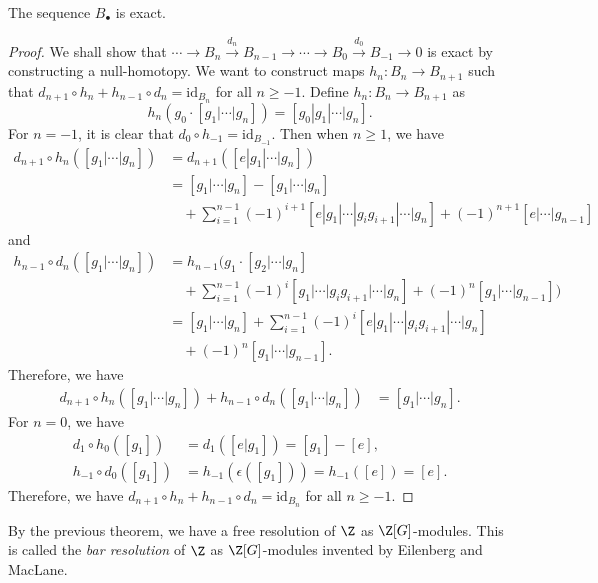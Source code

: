 \begin{theorem}
    The sequence $B_\bullet$ is exact.
\end{theorem}
\begin{proof}
    We shall show that $\cdots \to B_n \xrightarrow{d_n} B_{n-1} \to \cdots \to B_0 \xrightarrow{d_0} B_{-1} \to 0$ is exact
    by constructing a null-homotopy.
    We want to construct maps $h_n: B_n \to B_{n+1}$ such that $d_{n+1} \circ h_n + h_{n-1} \circ d_n = \text{id}_{B_n}$ for all $n \geq -1$.
    Define $h_n: B_n \to B_{n+1}$ as
    \[
        h_n(g_0\cdot [g_1|\cdots|g_n]) = [g_0|g_1|\cdots|g_n].
    \]
    For $n=-1$, it is clear that $d_0 \circ h_{-1} = \text{id}_{B_{-1}}$.
    Then when $n \geq 1$, we have
    \begin{align*}
        d_{n+1} \circ h_n([g_1|\cdots|g_n]) &= d_{n+1}([e|g_1|\cdots|g_n])\\
        &= [g_1|\cdots|g_n]-[g_1|\cdots|g_n] \\
        &\quad + \sum_{i=1}^{n-1} (-1)^{i+1} [e|g_1|\cdots|g_ig_{i+1}|\cdots|g_n] + (-1)^{n+1} [e|\cdots|g_{n-1}]
    \end{align*}
    and
    \begin{align*}
        h_{n-1} \circ d_n([g_1|\cdots|g_n]) &= h_{n-1}(g_1 \cdot [g_2|\cdots|g_n]\\
        &\quad + \sum_{i=1}^{n-1} (-1)^i [g_1|\cdots|g_ig_{i+1}|\cdots|g_n] + (-1)^n [g_1|\cdots|g_{n-1}])\\
        &= [g_1|\cdots|g_n] + \sum_{i=1}^{n-1} (-1)^i [e|g_1|\cdots|g_ig_{i+1}|\cdots|g_n]\\
        &\quad + (-1)^n [g_1|\cdots|g_{n-1}].
    \end{align*}
    Therefore, we have
    \begin{align*}
        d_{n+1} \circ h_n([g_1|\cdots|g_n]) + h_{n-1} \circ d_n([g_1|\cdots|g_n]) &= [g_1|\cdots|g_n].
    \end{align*}
    For $n=0$, we have
    \begin{align*}
        d_1 \circ h_0([g_1]) &= d_1([e|g_1]) = [g_1]-[e],\\
        h_{-1} \circ d_0([g_1]) &= h_{-1}(\epsilon([g_1])) = h_{-1}([e]) = [e].
    \end{align*}
    Therefore, we have $d_{n+1} \circ h_n + h_{n-1} \circ d_n = \text{id}_{B_n}$ for all $n \geq -1$.
\end{proof}

By the previous theorem, we have a free resolution of $\Z$ as $\Z[G]$-modules.
This is called the \textit{bar resolution} of $\Z$ as $\Z[G]$-modules
invented by Eilenberg and MacLane.

